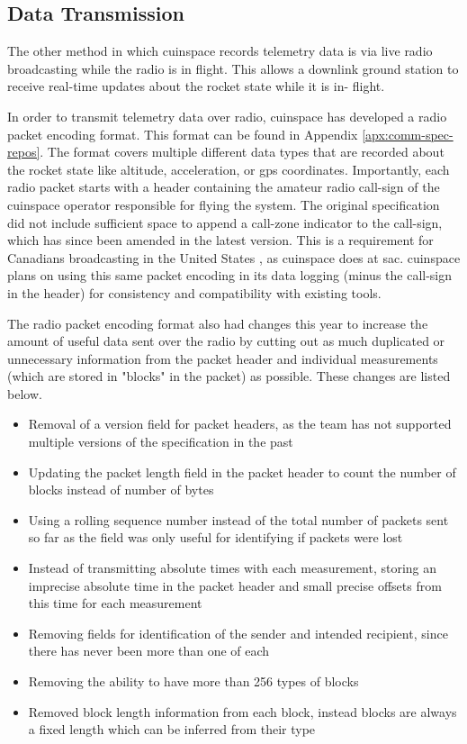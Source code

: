 \subsection{Data Transmission}

The other method in which \gls{cuinspace} records telemetry data is via live radio broadcasting while the radio is in
flight. This allows a downlink ground station to receive real-time updates about the rocket state while it is in-
flight.

In order to transmit telemetry data over radio, \gls{cuinspace} has developed a radio packet encoding format. This
format can be found in Appendix \ref{apx:comm-spec-repos}. The format covers multiple different data types that are
recorded about the rocket state like altitude, acceleration, or \gls{gps} coordinates. \cite{radio-comms}
Importantly, each radio packet starts with a header containing the amateur radio call-sign of the \gls{cuinspace}
operator responsible for flying the system. \cite{radio-comms} The original specification did not include sufficient
space to append a call-zone indicator to the call-sign, which has since been amended in the latest version. This is a
requirement for Canadians broadcasting in the United States \cite{foreign-broadcast}, as \gls{cuinspace} does at
\gls{sac}. \gls{cuinspace} plans on using this same packet encoding in its data logging (minus the call-sign in the header)
for consistency and compatibility with existing tools.

The radio packet encoding format also had changes this year to increase the amount of useful data sent over the radio by
cutting out as much duplicated or unnecessary information from the packet header and individual measurements (which are
stored in "blocks" in the packet) as possible. These changes are listed below.

\begin{itemize}
    \item Removal of a version field for packet headers, as the team has not supported multiple versions of the
          specification in the past
    \item Updating the packet length field in the packet header to count the number of blocks instead of number of bytes
    \item Using a rolling sequence number instead of the total number of packets sent so far as the field was only
          useful for identifying if packets were lost
    \item Instead of transmitting absolute times with each measurement, storing an imprecise absolute time in the packet
          header and small precise offsets from this time for each measurement
    \item Removing fields for identification of the sender and intended recipient, since there has never been more than
          one of each
    \item Removing the ability to have more than 256 types of blocks
    \item Removed block length information from each block, instead blocks are always a fixed length which can be inferred
          from their type
\end{itemize}

